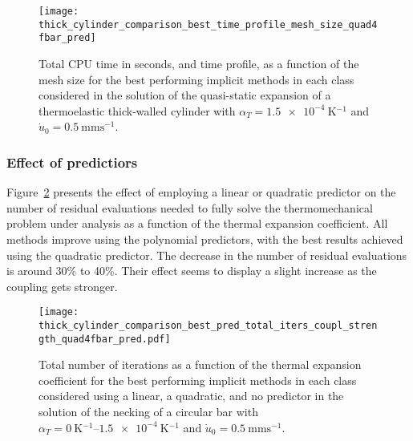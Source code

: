 \begin{table}[hbtp]
\begin{tabular}
 \hline\hline
 \end{tabular}
\end{table}

\begin{figure}[hbtp]
 \centering
 \texttt{[image: thick\_cylinder\_comparison\_best\_time\_profile\_mesh\_size\_quad4fbar\_pred]}
 \caption{Total CPU time in seconds, and time profile, as a function of the mesh size for the  best performing implicit methods in each class considered in the solution of the quasi-static expansion of a thermoelastic thick-walled cylinder with \(\alpha_T=\SI{1.5e-4}{\kelvin^{-1}}\) and \(\dot u_0 =\SI{0.5}{\milli\meter\second^{-1}}\).}
\label{fig:thick_cylinder_comparison_best_time_profile_mesh_size_quad4fbar_pred}
\end{figure}

\FloatBarrier

\subsubsection{Effect of predictiors}

Figure~\ref{fig:thick_cylinder_comparison_best_pred_total_iters_coupl_strength_quad4fbar_pred.pdf} presents the effect of employing a linear or quadratic predictor on the number of residual evaluations needed to fully solve the thermomechanical problem under analysis as a function of the thermal expansion coefficient.
All methods improve using the polynomial predictors, with the best results achieved using the quadratic predictor.
The decrease in the number of residual evaluations is around 30\% to 40\%.
Their effect seems to display a slight increase as the coupling gets stronger.

\begin{figure}[hbtp]
 \centering
 \texttt{[image: thick\_cylinder\_comparison\_best\_pred\_total\_iters\_coupl\_strength\_quad4fbar\_pred.pdf]}
 \caption{Total number of iterations as a function of the thermal expansion coefficient for the  best performing implicit methods in each class considered using a linear, a quadratic, and no predictor in the solution of the necking of a circular bar with \(\alpha_T=\SIrange{0}{1.5e-4}{\kelvin^{-1}}\) and \(\dot u_0 =\SI{0.5}{\milli\meter\second^{-1}}\).}
\label{fig:thick_cylinder_comparison_best_pred_total_iters_coupl_strength_quad4fbar_pred.pdf}
\end{figure}

\FloatBarrier

\pagebreak

